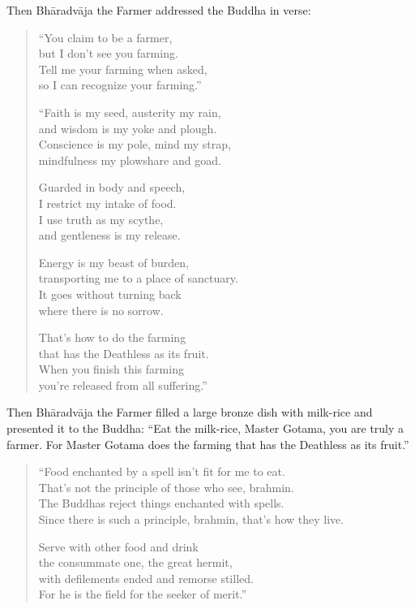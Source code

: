 \documentclass[12pt,openany]{book}%
\begin{document}
Then \textsanskrit{Bhāradvāja} the Farmer addressed the Buddha in verse: 

\begin{verse}%
“You claim to be a farmer, \\
but I don’t see you farming. \\
Tell me your farming when asked, \\
so I can recognize your farming.” 

“Faith is my seed, austerity my rain, \\
and wisdom is my yoke and plough. \\
Conscience is my pole, mind my strap, \\
mindfulness my plowshare and goad. 

Guarded in body and speech, \\
I restrict my intake of food. \\
I use truth as my scythe, \\
and gentleness is my release. 

Energy is my beast of burden, \\
transporting me to a place of sanctuary. \\
It goes without turning back \\
where there is no sorrow. 

That’s how to do the farming \\
that has the Deathless as its fruit. \\
When you finish this farming \\
you’re released from all suffering.” 

%
\end{verse}

Then \textsanskrit{Bhāradvāja} the Farmer filled a large bronze dish with milk-rice and presented it to the Buddha: “Eat the milk-rice, Master Gotama, you are truly a farmer. For Master Gotama does the farming that has the Deathless as its fruit.” 

\begin{verse}%
“Food enchanted by a spell isn’t fit for me to eat. \\
That’s not the principle of those who see, brahmin. \\
The Buddhas reject things enchanted with spells. \\
Since there is such a principle, brahmin, that’s how they live. 

Serve with other food and drink \\
the consummate one, the great hermit, \\
with defilements ended and remorse stilled. \\
For he is the field for the seeker of merit.” 

%
\end{verse}
\end{document}
